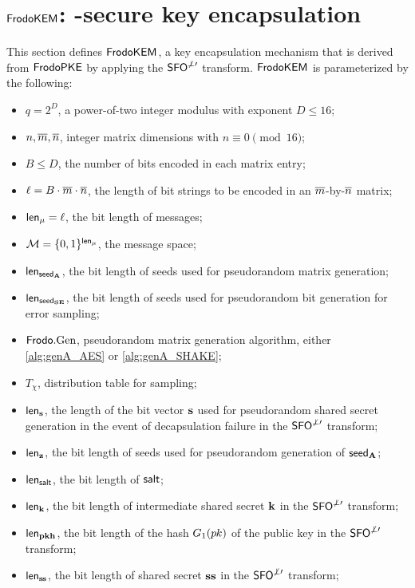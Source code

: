\section{$\textsf{\upshape\mdseries FrodoKEM}$: \INDCCA-secure key encapsulation}%
\label{sec:cca-kem}

This section defines $\textsf{\upshape\mdseries FrodoKEM}$, a key encapsulation mechanism that is derived from $\textsf{\upshape\mdseries FrodoPKE}$ by applying the $\textsf{\upshape\mdseries SFO}^{\not\perp\prime}$ transform.
$\textsf{\upshape\mdseries FrodoKEM}$ is parameterized by the following:
\begin{itemize}
\item $q=2^D$, a power-of-two integer modulus with exponent $D \leq 16$;
\item $n, \overline{m}, \overline{n}$, integer matrix dimensions with $n \equiv 0 \pmod {16}$;
\item $B \le D$, the number of bits encoded in each matrix entry;
\item $\ell=B\cdot \overline{m}\cdot\overline{n}$, the length of bit strings to be encoded in an $\overline{m}$-by-$\overline{n}$ matrix;
\item ${\mathsf{len}_{\mu}} = \ell$, the bit length of messages;
\item $\mathcal{M} = \{0,1\}^{\mathsf{len}_{\mu}}$, the message space;
\item ${\mathsf{len}_{{\mathsf{seed}_{\mathbf{A}}}}}$, the bit length of seeds used for pseudorandom matrix generation;
\item ${\mathsf{len}_{{\mathsf{seed}_{\mathbf{S}\mathbf{E}}}}}$, the bit length of seeds used for pseudorandom bit generation for error sampling;
\item $\textsf{\upshape\mdseries Frodo}.\textrm{\upshape\mdseries Gen}$, pseudorandom matrix generation algorithm, either \autoref{alg:genA_AES} or \autoref{alg:genA_SHAKE};
\item $T_\chi$, distribution table for sampling;
\item ${\mathsf{len}_{\mathbf{s}}}$, the length of the bit vector $\mathbf{s}$ used for pseudorandom shared secret generation in the event of decapsulation failure in the $\textsf{\upshape\mdseries SFO}^{\not\perp\prime}$ transform;
\item ${\mathsf{len}_{\mathbf{z}}}$, the bit length of seeds used for pseudorandom generation of ${\mathsf{seed}_{\mathbf{A}}}$;
\item {\color{black}${\mathsf{len}_{{\mathsf{salt}}}}$, the bit length of ${\mathsf{salt}}$;}
\item ${\mathsf{len}_{\mathbf{k}}}$, the bit length of intermediate shared secret $\mathbf{k}$ in the $\textsf{\upshape\mdseries SFO}^{\not\perp\prime}$ transform;
\item ${\mathsf{len}_{\mathbf{p}\mathbf{k}\mathbf{h}}}$, the bit length of the hash $G_1(p\mkern-0.5muk)$ of the public key in the $\textsf{\upshape\mdseries SFO}^{\not\perp\prime}$ transform;
\item ${\mathsf{len}_{\mathbf{s}\mkern-1mu\mathbf{s}}}$, the bit length of shared secret $\mathbf{s}\mathbf{s}$ in the $\textsf{\upshape\mdseries SFO}^{\not\perp\prime}$ transform;
\end{itemize}

